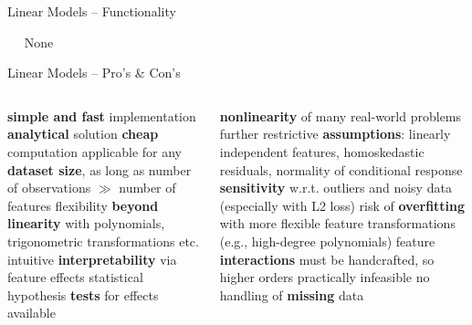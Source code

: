 \begin{vbframe}{Linear Models -- Functionality}
\medskip

 ~~ None

\medskip


\end{vbframe}


\begin{frame}{Linear Models -- Pro's \& Con's}

\footnotesize

\begin{columns}[onlytextwidth]
  \begin{column}{0.5\textwidth}
    \footnotesize
    \begin{itemize}
      \positem \textbf{simple and fast} implementation
      \positem \textbf{analytical} solution
      \positem \textbf{cheap} computation
      \positem applicable for any \textbf{dataset size}, as long as number of 
      observations $\gg$ number of features
      \positem flexibility \textbf{beyond linearity} with polynomials, 
      trigonometric transformations etc.
      \positem intuitive \textbf{interpretability} via feature effects
      \positem statistical hypothesis \textbf{tests} for effects available

    \end{itemize}
  \end{column}

  \begin{column}{0.5\textwidth}
    \footnotesize
    \begin{itemize}
      \negitem \textbf{nonlinearity} of many real-world problems
      \negitem further restrictive \textbf{assumptions}: linearly independent 
      features, homoskedastic residuals, normality of conditional response
      \negitem \textbf{sensitivity} w.r.t. outliers and noisy data (especially 
      with L2 loss)
      \negitem risk of \textbf{overfitting} with more flexible feature 
      transformations (e.g., high-degree polynomials)
      \negitem feature \textbf{interactions} must be handcrafted, so higher
      orders practically infeasible
      \negitem no handling of \textbf{missing} data
    \end{itemize}
  \end{column}
\end{columns}

\vfill

\small


\end{frame}

